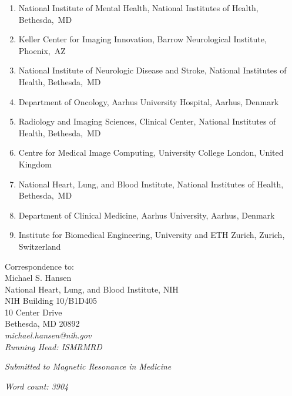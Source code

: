 \documentclass[12pt, draft]{article}
\begin{document}
\begin{flushleft}
\begin{enumerate}
\item National Institute of Mental Health, National Institutes of Health, Bethesda,~MD
\item Keller Center for Imaging Innovation, Barrow Neurological Institute, Phoenix,~AZ
\item National Institute of Neurologic Disease and Stroke, National Institutes of Health, Bethesda,~MD
\item Department of Oncology, Aarhus University Hospital, Aarhus, Denmark
\item Radiology and Imaging Sciences, Clinical Center, National Institutes of Health, Bethesda,~MD
\item Centre for Medical Image Computing, University College London, United Kingdom
\item National Heart, Lung, and Blood Institute, National Institutes of Health, Bethesda,~MD
\item Department of Clinical Medicine, Aarhus University, Aarhus, Denmark
\item Institute for Biomedical Engineering, University and ETH Zurich, Zurich, Switzerland
\end{enumerate}
\end{flushleft}

Correspondence to: \\
Michael S. Hansen \\
National Heart, Lung, and Blood Institute, NIH \\
NIH Building 10/B1D405 \\
10 Center Drive \\
Bethesda, MD 20892 \\
\textit{michael.hansen@nih.gov} \\

\textit{Running Head:  ISMRMRD}


\textit{Submitted to Magnetic Resonance in Medicine} 


\textit{Word count: 3904} %

\newpage
\clearpage
{} %
\pagestyle{plain}
\doublespacing
\end{document}
